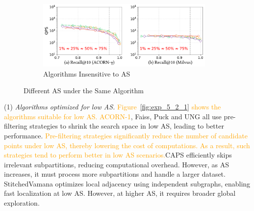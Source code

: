 \documentclass[sigconf, nonacm]{acmart}
\begin{document}
{\begin{figure}
\begin{subfigure}{0.33\textwidth}
			\includegraphics[width=0.96\textwidth]{figures/exp/exp_5_2_3.pdf}
			\caption{Algorithms Insensitive to AS}
			\label{fig:exp_5_2_3}
		\end{subfigure}
		
		
		\caption{Different AS under the Same Algorithm}
		\label{fig:exp_5_2_combined}
	\end{figure}
	
	
	
	
	(1) \textit{Algorithms optimized for low AS.}  
	\textcolor{orange}{Figure~\ref{fig:exp_5_2_1} shows the algorithms suitable for low AS.}
	\textcolor{orange}{ACORN-1}, Faiss, Puck and UNG all use pre-filtering strategies to shrink the search space in low AS, leading to better performance. \textcolor{orange}{Pre-filtering strategies significantly reduce the number of candidate points under low AS, thereby lowering the cost of  computations. As a result, such strategies tend to perform better in low AS scenarios.}CAPS efficiently skips irrelevant subpartitions, reducing computational overhead. However, as AS increases, it must process more subpartitions and handle a larger dataset. StitchedVamana optimizes local adjacency using independent subgraphs, enabling fast localization at low AS. However, at higher AS, it requires broader global exploration. 
	
	
	
}
\end{document}
